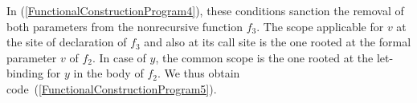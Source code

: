{In (\ref{FunctionalConstructionProgram4}), these conditions sanction
the removal of both parameters from the nonrecursive function $f_3$.
The scope applicable for $v$ at the site of declaration of $f_3$ and
also at its call site is the one rooted at the formal parameter $v$ of
$f_2$. In case of $y$, the common scope is the one rooted at the
let-binding for $y$ in the body of $f_2$. We thus obtain
code~(\ref{FunctionalConstructionProgram5}).
}
